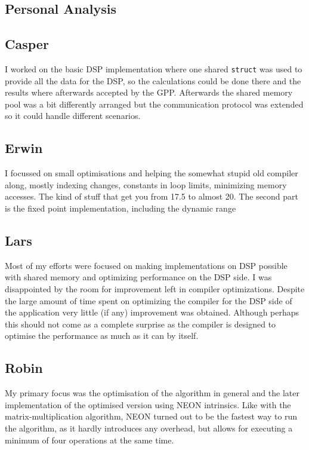 \documentclass[final]{article} %
\begin{document}
\begin{appendices}

\section{Personal Analysis}\label{app:appendix-personal-analysis}

\subsection{Casper}
I worked on the basic DSP implementation where one shared \texttt{struct} was used to provide all the data for the DSP, so the calculations could be done there and the results where afterwards accepted by the GPP.
Afterwards the shared memory pool was a bit differently arranged but the communication protocol was extended so it could handle different scenarios.

\subsection{Erwin}
I focussed on small optimisations and helping the somewhat stupid old compiler along, mostly indexing changes, constants in loop limits, minimizing memory accesses.
The kind of stuff that get you from \SI{17.5}{\speedup} to almost \SI{20}{\speedup}.
The second part is the fixed point implementation, including the dynamic range 

\subsection{Lars}
Most of my efforts were focused on making implementations on DSP possible with shared memory and optimizing performance on the DSP side.
I was disappointed by the room for improvement left in compiler optimizations.
Despite the large amount of time spent on optimizing the compiler for the DSP side of the application very little (if any) improvement was obtained.
Although perhaps this should not come as a complete surprise as the compiler is designed to optimise the performance as much as it can by itself.

\subsection{Robin}
My primary focus was the optimisation of the algorithm in general and the later implementation of the optimised version using NEON intrinsics.
Like with the matrix-multiplication algorithm, NEON turned out to be the fastest way to run the algorithm, as it hardly introduces any overhead, but allows for executing a minimum of four operations at the same time.


\end{appendices}
\end{document}
